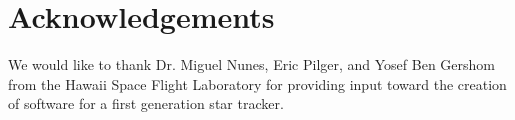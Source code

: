 \section{Acknowledgements}\label{sec:acknowledgements}
We would like to thank Dr. Miguel Nunes, Eric Pilger, and Yosef Ben Gershom from the Hawaii Space Flight Laboratory
for providing input toward the creation of software for a first generation star tracker.
